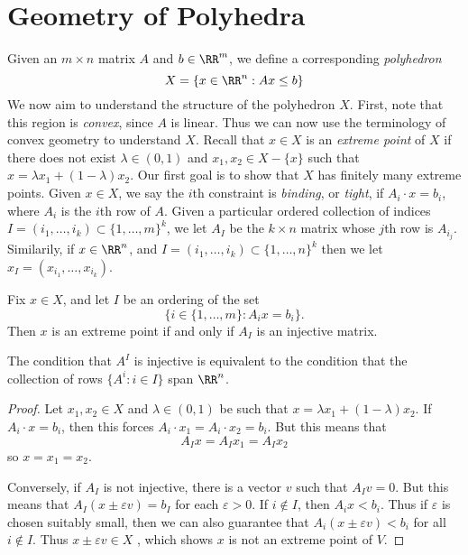 \chapter{Geometry of Polyhedra}

Given an $m \times n$ matrix $A$ and $b \in \RR^m$, we define a corresponding \emph{polyhedron}
%
\[ X = \{ x \in \RR^n: Ax \leq b \} \]
%
We now aim to understand the structure of the polyhedron $X$. First, note that this region is \emph{convex}, since $A$ is linear. Thus we can now use the terminology of convex geometry to understand $X$. Recall that $x \in X$ is an \emph{extreme point} of $X$ if there does not exist $\lambda \in (0,1)$ and $x_1, x_2 \in X - \{ x \}$ such that $x = \lambda x_1 + (1 - \lambda) x_2$. Our first goal is to show that $X$ has finitely many extreme points. Given $x \in X$, we say the $i$th constraint is \emph{binding}, or \emph{tight}, if $A_i \cdot x = b_i$, where $A_i$ is the $i$th row of $A$. Given a particular ordered collection of indices $I = (i_1, \dots, i_k) \subset \{ 1, \dots, m \}^k$, we let $A_I$ be the $k \times n$ matrix whose $j$th row is $A_{i_j}$. Similarily, if $x \in \RR^n$, and $I = (i_1, \dots, i_k) \subset \{ 1, \dots, n \}^k$ then we let $x_I = (x_{i_1}, \dots, x_{i_k})$.

\begin{lemma} \label{bindinglemma}
    Fix $x \in X$, and let $I$ be an ordering of the set
    \[ \{ i \in \{ 1, \dots, m \} : A_i x = b_i \}. \]
    Then $x$ is an extreme point if and only if $A_I$ is an injective matrix.
\end{lemma}

\begin{remark}
    The condition that $A^I$ is injective is equivalent to the condition that the collection of rows $\{ A^i : i \in I \}$ span $\RR^n$.
\end{remark}

\begin{proof}
    Let $x_1, x_2 \in X$ and $\lambda \in (0,1)$ be such that $x = \lambda x_1 + (1 - \lambda) x_2$. If $A_i \cdot x = b_i$, then this forces $A_i \cdot x_1 = A_i \cdot x_2 = b_i$. But this means that
    \[ A_I x = A_I x_1 = A_I x_2 \]
    so $x = x_1 = x_2$.

    Conversely, if $A_I$ is not injective, there  is a vector $v$ such that $A_I v = 0$. But this means that $A_I (x \pm \varepsilon v) = b_I$ for each $\varepsilon > 0$. If $i \not \in I$, then $A_i x < b_i$. Thus if $\varepsilon$ is chosen suitably small, then we can also guarantee that $A_i (x \pm \varepsilon v) < b_i$ for all $i \not \in I$. Thus $x \pm \varepsilon v \in X$ , which shows $x$ is not an extreme point of $V$. 
\end{proof}

